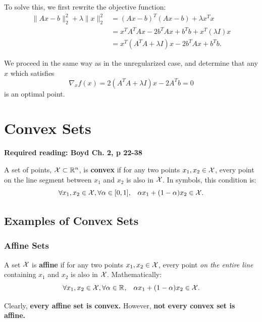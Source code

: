\documentclass[12pt]{article}
\begin{document}
To solve this, we first rewrite the objective function:
%
\begin{align*}
\|Ax - b \|_2^2 + \lambda \|x\|_2^2 &= (Ax-b)^T (Ax -b) + \lambda x^T x\\
&= x^T A^T A x - 2 b^T A x + b^T b + x^T (\lambda I) x \\
&= x^T \left( A^T A + \lambda I \right) x - 2b^T A x + b^T b.
\end{align*}

We proceed in the same way as in the unregularized case, and determine that any $x$ which satisfies 
%
\begin{equation*}
\nabla_x f(x) = 2(A^T A + \lambda I ) x - 2A^T b = 0
\end{equation*}
%
is an optimal point.

\section{Convex Sets}


\textbf{Required reading: Boyd Ch. 2, p 22-38}

A set of points, ${\mathcal X} \subset { {\mathbb R}^{n} }$, is \textbf{convex} if for any two points $x_1, x_2 \in {\mathcal X}$, every point on the line segment  between $x_1$ and $x_2$ is also in ${\mathcal X}$. In symbols, this condition is:
%
\begin{equation*}
\forall x_1, x_2 \in {\mathcal X}, \forall \alpha \in [0,1], \;\;\; \alpha x_1 + (1-\alpha) x_2 \in {\mathcal X}.
\end{equation*}

\subsection{Examples of Convex Sets}

\subsubsection{Affine Sets}

A set ${\mathcal X}$ is \textbf{affine} if for any two points $x_1, x_2 \in {\mathcal X}$, every point \textit{on the entire line} containing $x_1$ and $x_2$ is also in ${\mathcal X}$. Mathematically:
%
\begin{equation*}
\forall x_1, x_2 \in {\mathcal X}, \forall \alpha \in { {\mathbb R}^{} }, \;\;\; \alpha x_1 + (1-\alpha) x_2 \in {\mathcal X}.
\end{equation*}

Clearly, \textbf{every affine set is convex.} However, \textbf{not every convex set is affine.} 
\end{document}
